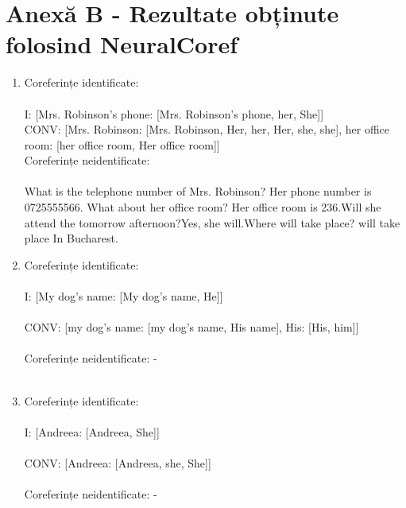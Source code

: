 \documentclass[letterpaper,12pt, dvipsnames, dateno]{article}
\begin{document}
\section{Anexă B - Rezultate obținute folosind NeuralCoref}
\begin{enumerate}[label=\textbf{\arabic*}]
  
    \item{
    Coreferințe identificate:\\ \\
    I: [Mrs. Robinson's phone: [Mrs. Robinson's phone, her, She]] \\
    CONV: [Mrs. Robinson: [Mrs. Robinson, Her, her, Her, she, she], her office room: [her office room, Her office room]]
    \\
    Coreferințe neidentificate: \\ \\
    What is the telephone number of Mrs. Robinson? Her phone number is 0725555566. What about her office room? Her office room is 236.Will she attend the  tomorrow afternoon?Yes,  she will.Where will   take place?  will take place In Bucharest.
    }
    
    \item{
    Coreferințe identificate:\\ \\
    I: [My dog's name: [My dog's name, He]] \\ \\
    CONV: [my dog's name: [my dog's name, His name], His: [His, him]]\\ \\
    Coreferințe neidentificate: - \\ \\
    }
    
    \item{
    Coreferințe identificate:\\ \\
    I: [Andreea: [Andreea, She]]\\ \\
    CONV: [Andreea: [Andreea, she, She]]\\ \\
    Coreferințe neidentificate: - \\ \\
    }
    
  
    

\end{enumerate}
\end{document}
